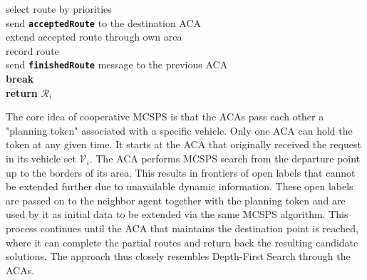 \documentclass[sigconf]{aamas}
\begin{document}
\begin{algorithm}
{{{{{                        select route by priorities\\
                        send \textbf{\texttt{acceptedRoute}} to the destination ACA\\
                    }
                }
            }
             {
                extend accepted route through own area\\
                record route\\
                send \textbf{\texttt{finishedRoute}} message to the previous ACA\\
            }
        }
         {
             {
                \textbf{break}\\
            }
        }
    }
    \textbf{return} $\mathcal{R}_i$\\
\end{algorithm}

The core idea of cooperative MCSPS is that the ACAs pass each other a "planning token" associated with a specific vehicle. Only one ACA can hold the token at any given time. It starts at the ACA that originally received the request in its vehicle set $\mathcal{V}_i$. The ACA performs MCSPS search from the departure point up to the borders of its area. This results in frontiers of open labels that cannot be extended further due to unavailable dynamic information. These open labels are passed on to the neighbor agent together with the planning token and are used by it as initial data to be extended via the same MCSPS algorithm. This process continues until the ACA that maintains the destination point is reached, where it can complete the partial routes and return back the resulting candidate solutions. The approach thus closely resembles Depth-First Search through the ACAs.
\end{document}
